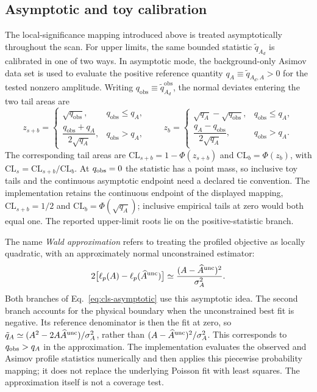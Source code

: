 \subsection{Asymptotic and toy calibration}

The local-significance mapping introduced above is treated asymptotically throughout
the scan. For upper limits, the same bounded statistic
$\tilde q_{A_d}$ is calibrated in one of two ways. In asymptotic mode, the
background-only Asimov data set is used to evaluate the positive reference quantity
$q_A\equiv\tilde q_{A_d,A}>0$ for the tested nonzero amplitude. Writing
$q_{\mathrm{obs}}\equiv\tilde q_{A_d}^{\mathrm{obs}}$, the normal deviates entering
the two tail areas are
\begin{equation}
z_{s+b}=
\begin{cases}
\sqrt{q_{\mathrm{obs}}}, & q_{\mathrm{obs}}\le q_A,\\[2pt]
\dfrac{q_{\mathrm{obs}}+q_A}{2\sqrt{q_A}}, & q_{\mathrm{obs}}>q_A,
\end{cases}
\qquad
z_b=
\begin{cases}
\sqrt{q_A}-\sqrt{q_{\mathrm{obs}}}, & q_{\mathrm{obs}}\le q_A,\\[2pt]
\dfrac{q_A-q_{\mathrm{obs}}}{2\sqrt{q_A}}, & q_{\mathrm{obs}}>q_A.
\end{cases}
\label{eq:cls-asymptotic}
\end{equation}
The corresponding tail areas are
$\mathrm{CL}_{s+b}=1-\Phi(z_{s+b})$ and $\mathrm{CL}_b=\Phi(z_b)$, with
$\mathrm{CL}_s=\mathrm{CL}_{s+b}/\mathrm{CL}_b$.
At $q_{\rm obs}=0$ the statistic has a point mass, so inclusive toy tails
and the continuous asymptotic endpoint need a declared tie convention.
The implementation retains the continuous endpoint of the displayed
mapping, $\mathrm{CL}_{s+b}=1/2$ and $\mathrm{CL}_b=\Phi(\sqrt{q_A})$;
inclusive empirical tails at zero would both equal one. The reported
upper-limit roots lie on the positive-statistic branch.

The name \emph{Wald approximation} refers to treating the profiled objective
as locally quadratic, with an approximately normal unconstrained estimator:
\begin{equation}
 2\bigl[\ell_p(A)-\ell_p(\widehat A^{\rm unc})\bigr]
 \simeq\frac{(A-\widehat A^{\rm unc})^2}{\sigma_A^2}.
 \label{eq:v501-wald}
\end{equation}
Both branches of Eq.~\eqref{eq:cls-asymptotic} use this asymptotic idea. The
second branch accounts for the physical boundary when the unconstrained
best fit is negative. Its reference denominator is then the fit at zero,
so $\tilde q_A\simeq(A^2-2A\widehat A^{\rm unc})/\sigma_A^2$, rather than
$(A-\widehat A^{\rm unc})^2/\sigma_A^2$. This corresponds to
$q_{\rm obs}>q_A$ in the approximation. The implementation evaluates the
observed and Asimov profile statistics numerically and then applies this
piecewise probability mapping; it does not replace the underlying Poisson
fit with least squares. The approximation itself is not a coverage test.

